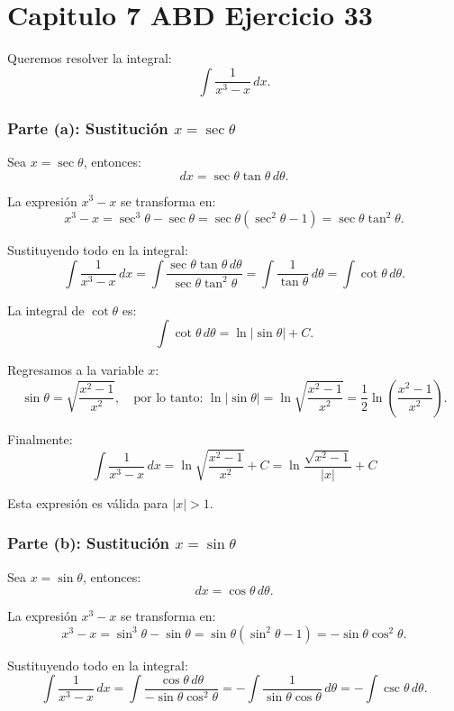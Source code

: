 \chapter*{Capitulo 7 ABD Ejercicio 33}

Queremos resolver la integral:
\[
\int \frac{1}{x^3 - x} \, dx.
\]

\subsection*{Parte (a): Sustitución \( x = \sec\theta \)}

Sea \( x = \sec\theta \), entonces:
\[
dx = \sec\theta \tan\theta \, d\theta.
\]

La expresión \( x^3 - x \) se transforma en:
\[
x^3 - x = \sec^3\theta - \sec\theta = \sec\theta (\sec^2\theta - 1) = \sec\theta \tan^2\theta.
\]

Sustituyendo todo en la integral:
\[
\int \frac{1}{x^3 - x} \, dx = \int \frac{\sec\theta \tan\theta \, d\theta}{\sec\theta \tan^2\theta} = \int \frac{1}{\tan\theta} \, d\theta = \int \cot\theta \, d\theta.
\]

La integral de \( \cot\theta \) es:
\[
\int \cot\theta \, d\theta = \ln|\sin\theta| + C.
\]

Regresamos a la variable \( x \):
\[
\sin\theta = \sqrt{\frac{x^2 - 1}{x^2}}, \quad \text{por lo tanto: } \ln|\sin\theta| = \ln\sqrt{\frac{x^2 - 1}{x^2}} = \frac{1}{2} \ln\left(\frac{x^2 - 1}{x^2}\right).
\]

Finalmente:
\[\boxed{
\int \frac{1}{x^3 - x} \, dx = \ln\sqrt{\frac{x^2 - 1}{x^2}} + C = \ln\frac{\sqrt{x^2 - 1}}{|x|} + C}
\]

Esta expresión es válida para \( |x| > 1 \).

\subsection*{Parte (b): Sustitución \( x = \sin\theta \)}

Sea \( x = \sin\theta \), entonces:
\[
dx = \cos\theta \, d\theta.
\]

La expresión \( x^3 - x \) se transforma en:
\[
x^3 - x = \sin^3\theta - \sin\theta = \sin\theta (\sin^2\theta - 1) = -\sin\theta \cos^2\theta.
\]

Sustituyendo todo en la integral:
\[
\int \frac{1}{x^3 - x} \, dx = \int \frac{\cos\theta \, d\theta}{-\sin\theta \cos^2\theta} = -\int \frac{1}{\sin\theta \cos\theta} \, d\theta = -\int \csc\theta \, d\theta.
\]

